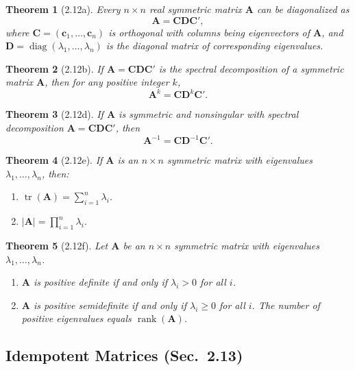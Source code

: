 \documentclass{article}
\newtheorem{theorem}{Theorem}[section]
\begin{document}
\begin{theorem}[2.12a]
Every $n \times n$ real symmetric matrix $\mathbf{A}$ can be diagonalized as
\[
\mathbf{A} = \mathbf{C}\mathbf{D}\mathbf{C}',
\]
where $\mathbf{C} = (\mathbf{c}_1, \dots, \mathbf{c}_n)$ is orthogonal with columns being eigenvectors of $\mathbf{A}$, and $\mathbf{D} = \operatorname{diag}(\lambda_1, \dots, \lambda_n)$ is the diagonal matrix of corresponding eigenvalues.
\end{theorem}

\begin{theorem}[2.12b]
If $\mathbf{A} = \mathbf{C}\mathbf{D}\mathbf{C}'$ is the spectral decomposition of a symmetric matrix $\mathbf{A}$, then for any positive integer $k$,
\[
\mathbf{A}^k = \mathbf{C}\mathbf{D}^k\mathbf{C}'.
\]
\end{theorem}

\begin{theorem}[2.12d]
If $\mathbf{A}$ is symmetric and nonsingular with spectral decomposition $\mathbf{A} = \mathbf{C}\mathbf{D}\mathbf{C}'$, then
\[
\mathbf{A}^{-1} = \mathbf{C}\mathbf{D}^{-1}\mathbf{C}'.
\]
\end{theorem}

\begin{theorem}[2.12e]
If $\mathbf{A}$ is an $n \times n$ symmetric matrix with eigenvalues $\lambda_1, \dots, \lambda_n$, then:
\begin{enumerate}[label=(\roman*)]
\item $\operatorname{tr}(\mathbf{A}) = \displaystyle\sum_{i=1}^{n} \lambda_i$.
\item $|\mathbf{A}| = \displaystyle\prod_{i=1}^{n} \lambda_i$.
\end{enumerate}
\end{theorem}

\begin{theorem}[2.12f]
Let $\mathbf{A}$ be an $n \times n$ symmetric matrix with eigenvalues $\lambda_1, \dots, \lambda_n$.
\begin{enumerate}[label=(\roman*)]
\item $\mathbf{A}$ is positive definite if and only if $\lambda_i > 0$ for all $i$.
\item $\mathbf{A}$ is positive semidefinite if and only if $\lambda_i \geq 0$ for all $i$. The number of positive eigenvalues equals $\operatorname{rank}(\mathbf{A})$.
\end{enumerate}
\end{theorem}

\subsection{Idempotent Matrices (Sec.\ 2.13)}
\end{document}
